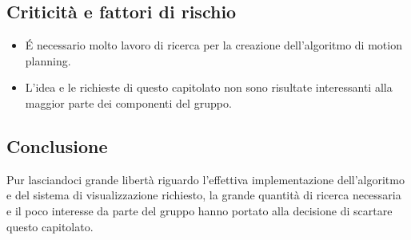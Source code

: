 \subsection{Criticità e fattori di rischio}
\begin{itemize}
\item É necessario molto lavoro di ricerca per la creazione dell'algoritmo di motion planning.
\item L'idea e le richieste di questo capitolato non sono risultate interessanti alla maggior parte dei componenti del gruppo.
\end{itemize}

\subsection{Conclusione}
Pur lasciandoci grande libertà riguardo l'effettiva implementazione dell'algoritmo e del sistema di visualizzazione richiesto, la grande quantità di ricerca necessaria e il poco interesse da parte del gruppo hanno portato alla decisione di scartare questo capitolato.